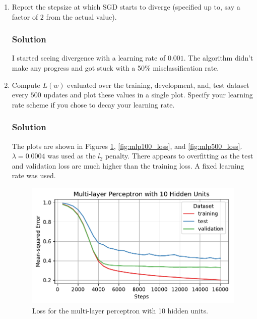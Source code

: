 \documentclass[letterpaper,11pt]{article}
\begin{document}
\begin{enumerate}
\item Report the stepsize at which SGD starts to diverge (specified up to, say a
  factor of $2$ from the actual value).

  \subsubsection*{Solution}

  I started seeing divergence with a learning rate of $0.001$. The algorithm
  didn't make any progress and got stuck with a 50\% misclassification rate.

  \item Compute $L(w)$ evaluated over the training, development, and, test
    dataset every $500$ updates and plot these values in a single plot. Specify
    your learning rate scheme if you chose to decay your learning rate.

    \subsubsection*{Solution}
    
    The plots are shown in Figures \ref{fig:mlp10_loss}, \ref{fig:mlp100_loss},
    and \ref{fig:mlp500_loss}. $\lambda = 0.0004$ was used as the $l_2$
    penalty. There appears to overfitting as the test and validation loss are
    much higher than the training loss. A fixed learning rate was used.

    \begin{figure}
      \centering
      \includegraphics{problem6/mlp10_loss.pdf}
      \caption{Loss for the multi-layer perceptron with 10 hidden units.}
      \label{fig:mlp10_loss}
    \end{figure}
    

\end{enumerate}
\end{document}
